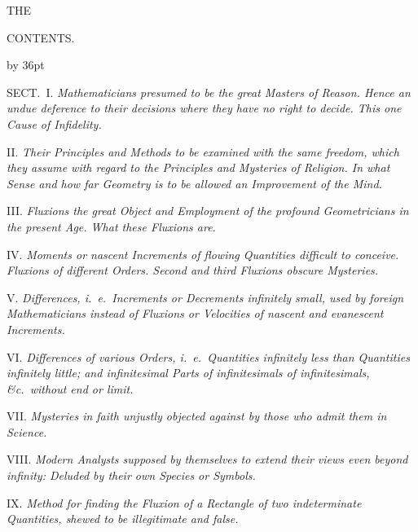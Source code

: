 
\null\vskip36pt

\centerline{\largerm THE}

\vskip12pt

\centerline{\Largerm CONTENTS.}

\vskip 12pt

\begingroup\advance\leftskip by 36pt

\item{SECT.~I.}
{\it
Mathematicians presumed to be the great Masters of Reason.  Hence
an undue deference to their decisions where they have no right to
decide.  This one Cause of Infidelity.}

\item{II.}
{\it
Their Principles and Methods to be examined with the same
freedom, which they assume with regard to the Principles and
Mysteries of Religion.  In what Sense and how far Geometry is to
be allowed an Improvement of the Mind.}

\item{III.}
{\it
Fluxions the great Object and Employment of the profound
Geometricians in the present Age.  What these Fluxions are.}

\item{IV.}
{\it
Moments or nascent Increments of flowing Quantities difficult to
conceive.  Fluxions of different Orders.  Second and third
Fluxions obscure Mysteries.}

\item{V.}
{\it
Differences, {\rm i.~e.}\ Increments or Decrements infinitely
small, used by foreign Mathematicians instead of Fluxions or
Velocities of nascent and evanescent Increments.}

\item{VI.}
{\it
Differences of various Orders, {\rm i.~e.}\ Quantities infinitely
less than Quantities infinitely little; and infinitesimal Parts
of infinitesimals of infinitesimals, {\it \&c.}\ without end or
limit.}

\item{VII.}
{\it
Mysteries in faith unjustly objected against by those who admit
them in Science.}

\item{VIII.}
{\it
Modern Analysts supposed by themselves to extend their views even
beyond infinity: Deluded by their own Species or Symbols.}

\item{IX.}
{\it
Method for finding the Fluxion of a Rectangle of two
indeterminate Quantities, shewed to be illegitimate and false.}

